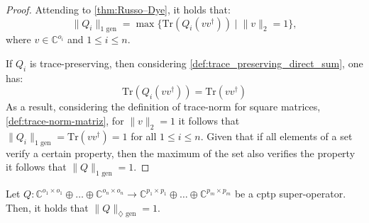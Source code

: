 \begin{proof}
Attending to \autoref{thm:Russo–Dye}, it holds that:
\begin{equation}
  \lVert Q_i \rVert_{1 \text{ gen}} = \max \{ \text{Tr}\left(Q_i(vv^{\dag}) \right) \mid \lVert v \rVert_{2}=1 \},
\end{equation}
where $v \in \mathbb{C}^{o_i}$ and $1 \leq i \leq n$.


If $Q_i$ is trace-preserving, then considering \autoref{def:trace_preserving_direct_sum}, one has:
\begin{equation}
\text{Tr} (Q_i(v v^{\dag})) =  \text{Tr} (v v^{\dag})
\end{equation}
As a result, considering the definition of trace-norm for square matrices, \autoref{def:trace-norm-matriz}, for $\|v\|_2 = 1$  it follows that $\lVert Q_i \rVert_{1 \text{ gen}} = \text{Tr} (v v^{\dag}) = 1$ for all $1 \leq i \leq n$. Given that if all elements of a set verify a certain property, then the maximum of the set also verifies the property it follows that $\lVert Q \rVert_{1 \text{ gen}} = 1$.

\end{proof}

\begin{corollary} \label{cor:gen_diamond_cptp_norm}
  Let  $Q: \mathbb{C}^{o_1 \times o_1} \oplus \ldots \oplus \mathbb{C}^{o_n \times o_n}  \rightarrow \mathbb{C}^{p_1 \times p_1} \oplus \ldots \oplus  \mathbb{C}^{p_m \times p_m}$ be a \acrshort{cptp} super-operator. Then, it holds that $\lVert Q \rVert_{\diamondsuit \text{ gen}} = 1$.
\end{corollary}

